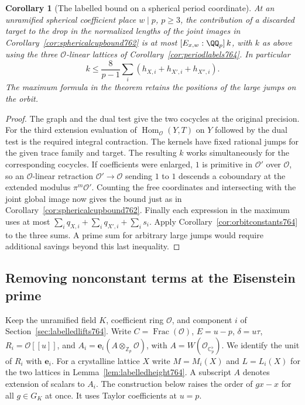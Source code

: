 \documentclass[a4paper,11pt]{article}
\newtheorem{corollary}[proposition]{Corollary}
\theoremstyle{definition}
\theoremstyle{remark}
\newcommand{\ZZ}{\mathbb Z}\newcommand{\ord}{\operatorname{ord}}
\numberwithin{equation}{section}
\begin{document}
\begin{corollary}[The labelled bound on a spherical period coordinate]
\leavevmode\label{cor:jointorbitcup765}
At an unramified spherical coefficient place \(w\mid p\),
\(p\ge3\), the contribution of a discarded target to the
drop in the normalized lengths of the joint images in
Corollary~\ref{cor:sphericalcupbound762} is at most
\([E_{x,w}:\QQ_p]\,k\), with \(k\) as above using the
three \(\mathcal O\)-linear lattices of
Corollary~\ref{cor:periodlabels764}. In particular
\[
        k\le \frac{8}{p-1}\sum_i
                     (h_{X,i}+h_{X',i}+h_{X'',i}).
\]
The maximum formula in the theorem retains the positions
of the large jumps on the orbit.
\end{corollary}
\begin{proof}
The graph and the dual test give the two cocycles at the
original precision. For the third extension evaluation of
\(\operatorname{Hom}_{\mathcal O}(Y,T)\) on \(Y\) followed
by the dual test is the required integral contraction.
The kernels have fixed rational jumps for the given trace
family and target. The resulting \(k\) works simultaneously
for the corresponding cocycles. If coefficients were
enlarged, \(1\) is primitive in \(\mathcal O'\) over
\(\mathcal O\), so an \(\mathcal O\)-linear retraction
\(\mathcal O'\to\mathcal O\) sending \(1\) to \(1\)
descends a coboundary at the extended modulus
\(\pi^m\mathcal O'\). Counting the free coordinates and
intersecting with the joint global image now gives the
bound just as in Corollary~\ref{cor:sphericalcupbound762}.
Finally each expression in the maximum uses at most
\(\sum_i q_{X,i}+\sum_i q_{X',i}+\sum_i s_i\).
Apply Corollary~\ref{cor:orbitconstants764} to the three
sums. A prime sum for arbitrary large jumps would require
additional savings beyond this last inequality.
\end{proof}
\clearpage

\subsection{Removing nonconstant terms at the Eisenstein prime}
\label{sec:taylordepth767}
Keep the unramified field \(K\), coefficient ring \(\mathcal O\),
and component \(i\) of Section~\ref{sec:labelledlifts764}.
Write \(C=\operatorname{Frac}(\mathcal O)\), \(E=u-p\),
\(\delta=u\tau\), \(R_i=\mathcal O[[u]]\), and
\(A_i=\mathbf e_i(A\otimes_{\ZZ_p}\mathcal O)\), with
\(A=W(\mathcal O_{\mathbb C_p^\flat})\). We identify the
unit of \(R_i\) with \(\mathbf e_i\). For a crystalline
lattice \(X\) write \(M=M_i(X)\) and \(L=L_i(X)\) for the
two lattices in Lemma~\ref{lem:labelledheight764}. A subscript
\(A\) denotes extension of scalars to \(A_i\). The construction
below raises the order of \(gx-x\) for all \(g\in G_K\)
at once. It uses Taylor coefficients at \(u=p\).
\end{document}
